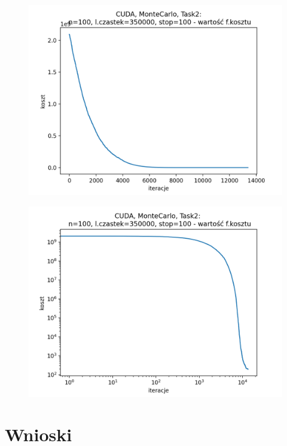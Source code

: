 \documentclass[11pt, a4paper, oneside]{article}
\begin{document}
\begin{figure}[H]
\centering
\begin{minipage}[b]{\dimexpr.5\textwidth-1em}
  \centering
  \includegraphics[width=1\linewidth]{grafiki2/CUDA/CUDA_MonteCarlo_Task2_koszt_linear.png}
  \label{fig:koszt:MC2CUDA}
\end{minipage} \hfill
\begin{minipage}[b]{\dimexpr.5\textwidth-1em}
  \centering
  \includegraphics[width=1\linewidth]{grafiki2/CUDA/CUDA_MonteCarlo_Task2_koszt_log.png}
  \label{fig:koszt:MC2CUDAlog}
\end{minipage}
\end{figure}


\section{Wnioski} 



{}

\end{document}
